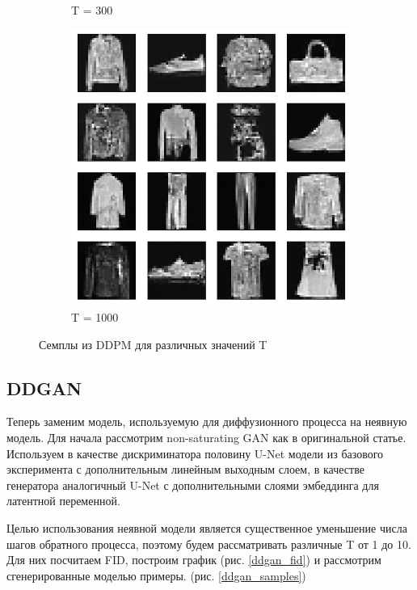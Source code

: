 \documentclass{article}
\begin{document}
\begin{figure}[H]
\begin{subfigure}[h]{0.3\linewidth}
		\caption{T = 300}
	\end{subfigure}
	\hfill
	\begin{subfigure}[h]{0.3\linewidth}
		\centering
		\includegraphics[scale=0.3]{../code/generated_DDPM_1000.png}
		\caption{T = 1000}
	\end{subfigure}
\caption{Семплы из DDPM для различных значений T}\label{ddpm_samples}
\end{figure}

\subsection{DDGAN}
Теперь заменим модель, используемую для диффузионного процесса на неявную модель. Для начала рассмотрим non-saturating GAN \cite{https://doi.org/10.48550/arxiv.1406.2661} как в оригинальной статье. Используем в качестве дискриминатора половину U-Net модели из базового эксперимента с дополнительным линейным выходным слоем, в качестве генератора аналогичный U-Net с дополнительными слоями эмбеддинга для латентной переменной. 

Целью использования неявной модели является существенное уменьшение числа шагов обратного процесса, поэтому будем рассматривать различные T от 1 до 10. Для них посчитаем FID, построим график (рис. \ref{ddgan_fid}) и рассмотрим сгенерированные моделью примеры. (рис. \ref{ddgan_samples})
\end{document}
